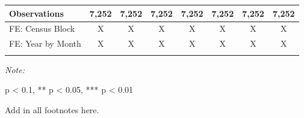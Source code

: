 \begin{table}[H]
\begin{threeparttable}
\begin{tabular}[t]{lccccccc}
\hspace{1em}Observations & 7,252 & 7,252 & 7,252 & 7,252 & 7,252 & 7,252 & 7,252\\
\midrule
FE: Census Block & X & X & X & X & X & X & X\\
FE: Year by Month & X & X & X & X & X & X & X\\
\midrule\\
\bottomrule
\end{tabular}
\begin{tablenotes}
\item \textit{Note: } 
\item * p < 0.1, ** p < 0.05, *** p < 0.01
\item Add in all footnotes here.
\end{tablenotes}
\end{threeparttable}
\end{table}
